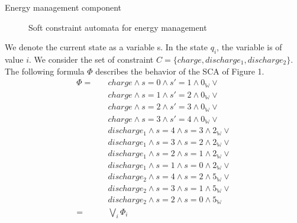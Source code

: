 \begin{example}Energy management component\\
\begin{figure}[H]
	\centering
	\resizebox{12cm}{!}{}
	\caption{Soft constraint automata for energy management}\label{fig:myfigure}
\end{figure}
We denote the current state as a variable s. In the state $q_i$, the variable is of value $i$. 
We consider the set of constraint $C = \{charge, discharge_1, discharge_2\}$. The following formula $\Phi$ describes the behavior of the SCA of Figure 1.
\begin{align*}
\Phi =  & \quad charge \land s = 0 \land s'= 1 \land 0_\mathbb{W} \lor \\ 
& \quad charge \land s = 1 \land s'= 2 \land 0_\mathbb{W} \lor \\ 
& \quad charge \land s = 2 \land s'= 3 \land 0_\mathbb{W} \lor \\ 
& \quad charge \land s = 3 \land s'= 4 \land 0_\mathbb{W} \lor \\ & \quad discharge_{1} \land s = 4 \land s = 3 \land 2_\mathbb{W} \lor \\
& \quad discharge_{1} \land s = 3 \land s = 2 \land 2_\mathbb{W} \lor \\
& \quad discharge_{1} \land s = 2 \land s = 1 \land 2_\mathbb{W} \lor \\
& \quad discharge_{1} \land s = 1 \land s = 0 \land 2_\mathbb{W} \lor \\
& \quad discharge_{2} \land s = 4 \land s = 2 \land 5_\mathbb{W} \lor \\
& \quad discharge_{2} \land s = 3 \land s = 1 \land 5_\mathbb{W} \lor \\
& \quad discharge_{2} \land s = 2 \land s = 0 \land 5_\mathbb{W} \\
	= & \quad \bigvee_i \Phi_i
\end{align*}


\end{example}
